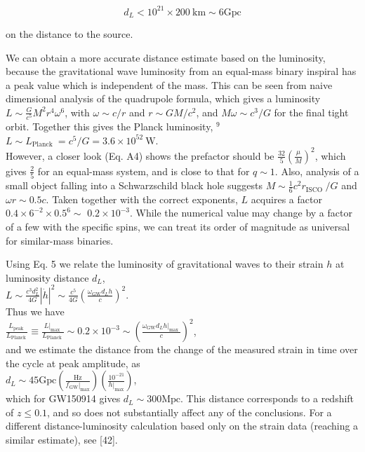 \documentclass[10pt]{article}
\begin{document}
\begin{equation*}
d_{L}<10^{21} \times 200 \mathrm{~km} \sim 6 \mathrm{Gpc} \tag{18}
\end{equation*}


on the distance to the source.

We can obtain a more accurate distance estimate based on the luminosity, because the gravitational wave luminosity from an equal-mass binary inspiral has a peak value which is independent of the mass. This can be seen from naive dimensional analysis of the quadrupole formula, which gives a luminosity $L \sim \frac{G}{c^{5}} M^{2} r^{4} \omega^{6}$, with $\omega \sim c / r$ and $r \sim G M / c^{2}$, and $M \omega \sim c^{3} / G$ for the final tight orbit. Together this gives the Planck luminosity, ${ }^{9}$\\
$L \sim L_{\text {Planck }}=c^{5} / G=3.6 \times 10^{52} \mathrm{~W}$.\\
However, a closer look (Eq. A4) shows the prefactor should be $\frac{32}{5}\left(\frac{\mu}{M}\right)^{2}$, which gives $\frac{2}{5}$ for an equal-mass system, and is close to that for $q \sim 1$. Also, analysis of a small object falling into a Schwarzschild black hole suggests $M \sim \frac{1}{6} c^{2} r_{\text {ISCO }} / G$ and $\omega r \sim 0.5 c$. Taken together with the correct exponents, $L$ acquires a factor $0.4 \times 6^{-2} \times 0.5^{6} \sim$ $0.2 \times 10^{-3}$. While the numerical value may change by a factor of a few with the specific spins, we can treat its order of magnitude as universal for similar-mass binaries.

Using Eq. 5 we relate the luminosity of gravitational waves to their strain $h$ at luminosity distance $d_{L}$,\\
$L \sim \frac{c^{3} d_{L}^{2}}{4 G}|\dot{h}|^{2} \sim \frac{c^{5}}{4 G}\left(\frac{\omega_{\mathrm{GW}} d_{L} h}{c}\right)^{2}$.\\
Thus we have\\
$\frac{L_{\text {peak }}}{L_{\text {Planck }}} \equiv \frac{\left.L\right|_{\text {max }}}{L_{\text {Planck }}} \sim 0.2 \times 10^{-3} \sim\left(\frac{\left.\omega_{\mathrm{GW}} d_{L} h\right|_{\text {max }}}{c}\right)^{2}$,\\
and we estimate the distance from the change of the measured strain in time over the cycle at peak amplitude, as\\
$d_{L} \sim 45 \mathrm{Gpc}\left(\frac{\mathrm{Hz}}{\left.f_{\mathrm{GW}}\right|_{\max }}\right)\left(\frac{10^{-21}}{\left.h\right|_{\max }}\right)$,\\
which for GW150914 gives $d_{L} \sim 300 \mathrm{Mpc}$. This distance corresponds to a redshift of $z \leq 0.1$, and so does not substantially affect any of the conclusions. For a different distance-luminosity calculation based only on the strain data (reaching a similar estimate), see [42].
\end{document}
